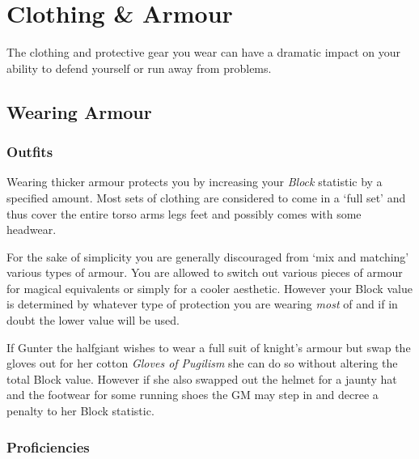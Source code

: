 \chapter{Clothing \& Armour} \label{S:Armour}

The clothing and protective gear you wear can have a dramatic impact on your ability to defend yourself\comma{} or run away from problems. 

\section{Wearing Armour}

\subsection{Outfits}

Wearing thicker armour protects you\comma{} by increasing your {\it Block} statistic by a specified amount. Most sets of clothing are considered to come in a `full set'\comma{} and thus cover the entire torso\comma{} arms\comma{} legs\comma{} feet \minus{} and possibly comes with some headwear. 

For the sake of simplicity\comma{} you are generally discouraged from `mix and matching' various types of armour. You are allowed to switch out various pieces of armour for magical equivalents\comma{} or simply for a cooler aesthetic. However\comma{} your Block value is determined by whatever type of protection you are wearing {\it most} of \minus{} and if in doubt\comma{} the lower value will be used. 

If Gunter the half\minus{}giant wishes to wear a full suit of knight's armour\comma{} but swap the gloves out for her cotton {\it Gloves of Pugilism}\comma{} she can do so without altering the total Block value. However\comma{} if she also swapped out the helmet for a jaunty hat\comma{} and the footwear for some running shoes\comma{} the GM may step in and decree a penalty to her Block statistic. 

\def\y{1.3}
\def\w{3.3}
\def\x{2.6}
\def\u{0.8}
\newcommand\armour[4]
{
\\
	\parbox[t]{\y cm}{\raggedright\textbf{\footnotesize\textit{#1}}} & \parbox[t]{\w cm}{\footnotesize#2} &  \parbox[t]{\x cm}{\footnotesize\raggedright #3}	&	\parbox[t]{\u cm}{\centering #4}
	
}

\subsection{Proficiencies}

